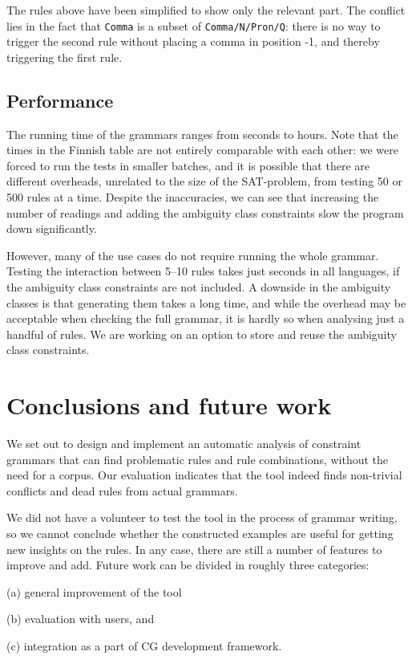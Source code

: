 {{The rules above have been simplified to show only the relevant part.
The conflict lies in the fact that \texttt{Comma} is a subset of \texttt{Comma/N/Pron/Q}:
there is no way to trigger the second rule without placing a comma in position -1, and thereby triggering the first rule.




\subsection{Performance} 
The running time of the grammars ranges from seconds to hours. 
Note that the times in the Finnish table are not entirely comparable with each other: we were forced to run the tests in smaller batches, and it is possible that there are different overheads, unrelated to the size of the SAT-problem, from testing 50 or 500 rules at a time. 
Despite the inaccuracies, we can see that increasing the number of readings 
and adding the ambiguity class constraints
slow the program down significantly.

However, many of the use cases do not require running the whole
grammar. Testing the interaction between 5--10 rules takes just
seconds in all languages, if the ambiguity class constraints are not included. 
A downside in the ambiguity classes is that generating them takes a long time, 
and while the overhead may be acceptable when checking the full grammar,
it is hardly so when analysing just a handful of rules. 
We are working on an option to store and reuse the ambiguity class constraints.

\section{Conclusions and future work}

We set out to design and implement an automatic analysis of constraint grammars that can find problematic rules and rule combinations, without the need for a corpus.
Our evaluation indicates that the tool indeed finds non-trivial conflicts and dead rules
from actual grammars. 

We did not have a volunteer to test the tool in
the process of grammar writing, so we cannot conclude whether the
constructed examples are useful for getting new insights on the rules.
In any case, there are still a number of features to improve and add.
Future work can be divided in roughly three categories: 
\begin{inparaenum}
\item[(a)] general improvement of the tool
\item[(b)] evaluation with users, and 
\item[(c)] integration as a part of CG development framework.
\end{inparaenum}

}}
